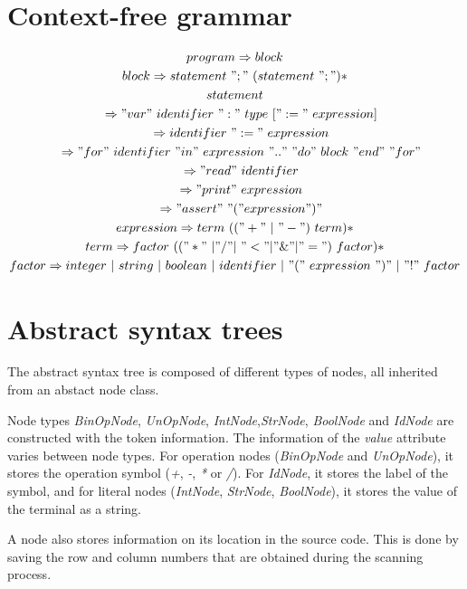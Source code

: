 \documentclass[fleqn]{article}
\begin{document}
\section{Context-free grammar}
\begin{gather*}
    program \Rightarrow block \\
    block \Rightarrow statement \ ";" \ (statement \ ";")* \\
    statement \\
    \quad \Rightarrow "var" \ identifier \ ":" \ type \ [ ":=" expression ] \\
    \quad \Rightarrow identifier \ ":=" \ expression \\
    \quad \Rightarrow "for" \ identifier \ "in"  expression \ ".." \ "do" \ block \ "end" \ "for" \\
    \quad \Rightarrow "read" \ identifier \\
    \quad \Rightarrow "print" \ expression \\
    \quad \Rightarrow "assert" \ "(" expression ")" \\
    expression \Rightarrow term \ (("+" \ | \ "-") \ term)* \\
    term \Rightarrow factor \ (("*" \ | "/" | "<" | "\&" | "=") \ factor)*  \\
    factor \Rightarrow integer \ | \ string \ | \ boolean \ | \ identifier \ | "(" \ expression \ ")" \ | \ "!" factor
\end{gather*}

\newpage
\section{Abstract syntax trees}
The abstract syntax tree is composed of different types of nodes, all inherited from an abstact node class.
\par
Node types \textit{BinOpNode}, \textit{UnOpNode}, \textit{IntNode},\textit{StrNode}, \textit{BoolNode} and \textit{IdNode}
are constructed with the token information. The information of the \textit{value} attribute varies between node types.
For operation nodes (\textit{BinOpNode} and \textit{UnOpNode}), it stores the operation symbol (\textit{+}, \textit{-}, \textit{*} or \textit{/}).
For \textit{IdNode}, it stores the label of the symbol, and for literal nodes (\textit{IntNode}, \textit{StrNode}, \textit{BoolNode}),
it stores the value of the terminal as a string.
\par
A node also stores information on its location in the source code. This is done by saving the row and column numbers that are obtained during the scanning process.
\end{document}
